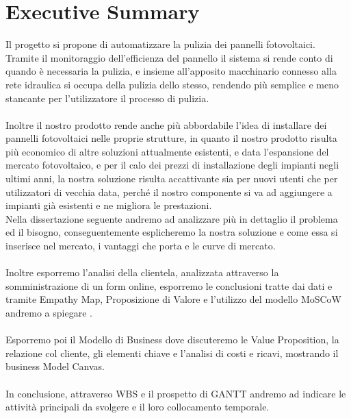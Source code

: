 \documentclass[a4paper, 12pt]{article}
\begin{document}
	\section{Executive Summary} %
	Il progetto si propone di automatizzare la pulizia dei pannelli fotovoltaici.\\
	Tramite il monitoraggio dell'efficienza del pannello il sistema si rende conto di quando è necessaria la pulizia, e insieme all'apposito macchinario connesso alla rete idraulica si occupa della pulizia dello stesso, rendendo più semplice e meno stancante per l'utilizzatore il processo di pulizia.\\\\
	Inoltre il nostro prodotto rende anche più abbordabile l'idea di installare dei pannelli fotovoltaici nelle proprie strutture, in quanto il nostro prodotto risulta più economico di altre soluzioni attualmente esistenti, e data l'espansione del mercato fotovoltaico, e per il calo dei prezzi di installazione degli impianti negli ultimi anni, la nostra soluzione risulta accattivante sia per nuovi utenti che per utilizzatori di vecchia data, perché il nostro componente si va ad aggiungere a impianti già esistenti e ne migliora le prestazioni. \\
	Nella dissertazione seguente andremo ad analizzare più in dettaglio il problema ed il bisogno, conseguentemente esplicheremo la nostra soluzione e come essa si inserisce nel mercato, i vantaggi che porta e le curve di mercato.\\
	\\
	Inoltre esporremo l'analisi della clientela, analizzata attraverso la somministrazione di un form online, %
	 esporremo le conclusioni tratte dai dati e tramite Empathy Map, Proposizione di Valore e l'utilizzo del modello MoSCoW andremo a spiegare %
	 . \\\\
	 Esporremo poi il Modello di Business dove discuteremo le Value Proposition, la relazione col cliente, gli elementi chiave e l'analisi di costi e ricavi, mostrando il business Model Canvas.
	\\\\
	In conclusione, attraverso WBS e il prospetto di GANTT andremo ad indicare le attività principali da svolgere e il loro collocamento temporale.
	\\\\
\end{document}
